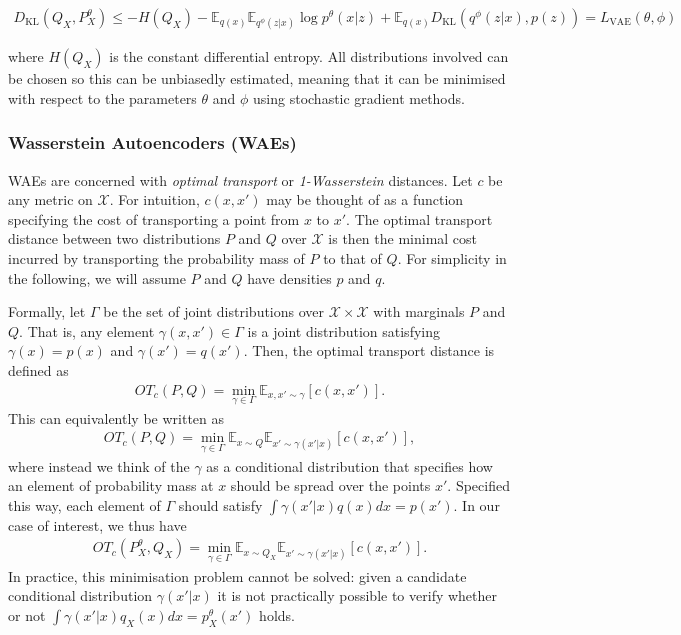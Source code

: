 \begin{align*}
D_{\text{KL}}(Q_X, P^\theta_X) \leq -H(Q_X)  - \mathbb{E}_{q(x)} \mathbb{E}_{q^\phi(z|x)} \log p^\theta(x|z) + \mathbb{E}_{q(x)}D_{\text{KL}}\left(q^\phi(z|x), p(z)\right) = L_{\text{VAE}}(\theta, \phi)
\end{align*}

where $H(Q_X)$ is the constant differential entropy.
All distributions involved can be chosen so this can be unbiasedly estimated, meaning that it can be minimised with respect to the parameters $\theta$ and $\phi$ using stochastic gradient methods.

\subsubsection{Wasserstein Autoencoders (WAEs)}

WAEs \citep{tolstikhin et al} are concerned with \emph{optimal transport} or \emph{1-Wasserstein} distances.
Let $c$ be any metric on $\mathcal{X}$.
For intuition, $c(x, x')$ may be thought of as a function specifying the cost of transporting a point from $x$ to $x'$.
The optimal transport distance between two distributions $P$ and $Q$ over $\mathcal{X}$ is then the minimal cost incurred by transporting the probability mass of $P$ to that of $Q$.
For simplicity in the following, we will assume $P$ and $Q$ have densities $p$ and $q$. 

Formally, let $\Gamma$ be the set of joint distributions over $\mathcal{X} \times \mathcal{X}$ with marginals $P$ and $Q$. 
That is, any element $\gamma(x, x') \in \Gamma$ is a joint distribution satisfying $\gamma(x) = p(x)$ and $\gamma(x') = q(x')$.
Then, the optimal transport distance is defined as
%
\begin{align*}
OT_c(P, Q) = \min_{\gamma \in \Gamma} \mathbb{E}_{x, x' \sim \gamma} \left[ c(x, x') \right].
\end{align*}
%
This can equivalently be written as
%
\begin{align*}
OT_c(P, Q) = \min_{\gamma \in \Gamma} \mathbb{E}_{x\sim Q} \mathbb{E}_{x'\sim \gamma(x'|x)} \left[ c(x, x') \right],
\end{align*}
%
where instead we think of the $\gamma$ as a conditional distribution that specifies how an element of probability mass at $x$ should be spread over the points $x'$. 
Specified this way, each element of $\Gamma$ should satisfy $\int \gamma(x'|x) q(x) dx = p(x')$.
In our case of interest, we thus have
%
\begin{align*}
OT_c(P_X^\theta, Q_X) = \min_{\gamma \in \Gamma} \mathbb{E}_{x\sim Q_X} \mathbb{E}_{x'\sim \gamma(x'|x)} \left[ c(x, x') \right].
\end{align*}
%
In practice, this minimisation problem cannot be solved: given a candidate conditional distribution $\gamma(x'|x)$ it is not practically possible to verify whether or not $\int \gamma(x'|x) q_X(x) dx = p_X^\theta(x')$ holds.

